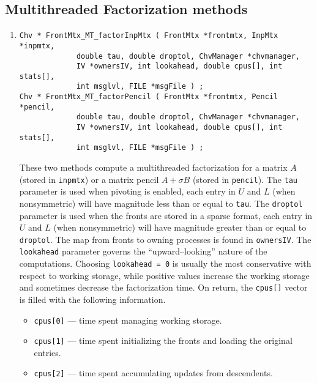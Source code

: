 \subsection{Multithreaded Factorization methods}
\label{subsection:FrontMtx:proto:factorMT}
\par
\begin{enumerate}
\item
\begin{verbatim}
Chv * FrontMtx_MT_factorInpMtx ( FrontMtx *frontmtx, InpMtx *inpmtx, 
             double tau, double droptol, ChvManager *chvmanager,
             IV *ownersIV, int lookahead, double cpus[], int stats[],  
             int msglvl, FILE *msgFile ) ;
Chv * FrontMtx_MT_factorPencil ( FrontMtx *frontmtx, Pencil *pencil, 
             double tau, double droptol, ChvManager *chvmanager,
             IV *ownersIV, int lookahead, double cpus[], int stats[],  
             int msglvl, FILE *msgFile ) ;
\end{verbatim}
These two methods compute a multithreaded factorization for a matrix
$A$ (stored in {\tt inpmtx}) or a matrix pencil
$A + \sigma B$ (stored in {\tt pencil}).
The {\tt tau} parameter is used when pivoting is enabled, each
entry in $U$ and $L$ (when nonsymmetric) will have magnitude less
than or equal to {\tt tau}.
The {\tt droptol} parameter is used when the fronts are stored in
a sparse format, each entry in $U$ and $L$ (when nonsymmetric) 
will have magnitude greater than or equal to {\tt droptol}.
The map from fronts to owning processes is found in {\tt ownersIV}.
The {\tt lookahead} parameter governs the
``upward--looking'' nature of the computations.
Choosing {\tt lookahead = 0} is usually the most conservative with
respect to working storage, while positive values increase the
working storage and sometimes decrease the factorization time.
On return, the {\tt cpus[]} vector is filled with the following
information.
\begin{itemize}
\item
{\tt cpus[0]} --- time spent managing working storage.
\item
{\tt cpus[1]} --- time spent initializing the fronts
                  and loading the original entries.
\item
{\tt cpus[2]} --- time spent accumulating updates from descendents.

\end{itemize}
\end{enumerate}
